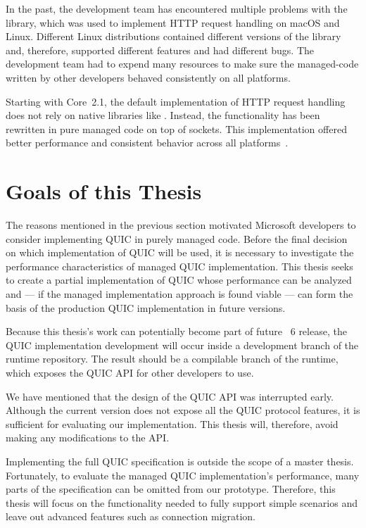 In the past, the \dotnet{} development team has encountered multiple problems with the
\libcurl~\cite{curlGithub} library, which was used to implement HTTP request handling on macOS and
Linux. Different Linux distributions contained different versions of the \libcurl{} library and,
therefore, supported different features and had different bugs. The \dotnet{} development team had
to expend many resources to make sure the \gls{managed-code} written by other \dotnet{} developers
behaved consistently on all platforms.

Starting with \dotnet{} Core~2.1, the default implementation of HTTP request handling does not rely
on native libraries like \libcurl{}. Instead, the functionality has been rewritten in pure managed
code on top of sockets. This implementation offered better performance and consistent behavior
across all \dotnet{} platforms~\cite{SocketsHttpHandlerDocs}.

\section{Goals of this Thesis}\label{sec:01-goals}

The reasons mentioned in the previous section motivated Microsoft developers to consider
implementing QUIC in purely managed \csharp{} code. Before the final decision on which
implementation of QUIC will be used, it is necessary to investigate the performance characteristics
of managed QUIC implementation. This thesis seeks to create a partial implementation of QUIC whose
performance can be analyzed and --- if the managed implementation approach is found viable --- can form
the basis of the production QUIC implementation in future \dotnet{} versions.

Because this thesis's work can potentially become part of future \dotnet{}~6 release, the QUIC
implementation development will occur inside a development branch of the \dotnet{} runtime
repository. The result should be a compilable branch of the runtime, which exposes the QUIC API for
other \dotnet{} developers to use.

We have mentioned that the design of the QUIC API was interrupted early. Although the current
version does not expose all the QUIC protocol features, it is sufficient for evaluating our
implementation. This thesis will, therefore, avoid making any modifications to the API\@.

Implementing the full QUIC specification is outside the scope of a master thesis. Fortunately, to
evaluate the managed QUIC implementation's performance, many parts of the specification can be
omitted from our prototype. Therefore, this thesis will focus on the functionality needed to fully
support simple scenarios and leave out advanced features such as connection migration.

